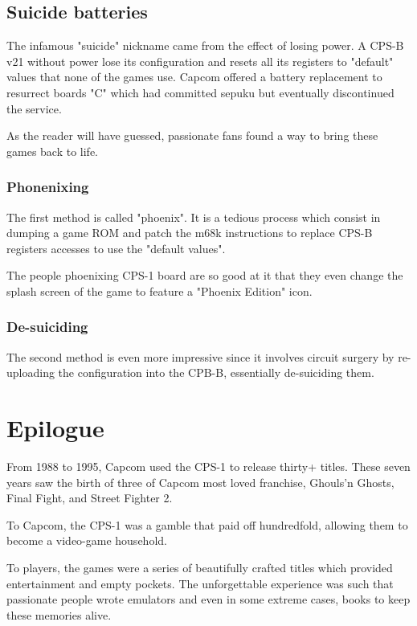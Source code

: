 \subsection{Suicide batteries}
The infamous "suicide" nickname came from the effect of losing power. A CPS-B v21 without power lose its configuration and resets all its registers to "default" values that none of the games use. Capcom offered a battery replacement to resurrect boards "C" which had committed sepuku but eventually discontinued the service. 

As the reader will have guessed, passionate fans found a way to bring these games back to life.

\subsubsection{Phonenixing}
The first method is called "phoenix". It is a tedious process which consist in dumping a game ROM and patch the m68k instructions to replace CPS-B registers accesses to use the "default values"\cite{csp1_phoenix}. 

The people phoenixing CPS-1 board are so good at it that they even change the splash screen of the game to feature a "Phoenix Edition" icon.

\subsubsection{De-suiciding}
The second method is even more impressive since it involves circuit surgery by re-uploading the configuration into the CPB-B, essentially de-suiciding them\cite{arcadeHackerCPS1Desuicide}.






\section{Epilogue}
From 1988 to 1995, Capcom used the CPS-1 to release thirty+ titles. These seven years saw the birth of three of Capcom most loved franchise, Ghouls’n Ghosts, Final Fight, and Street Fighter 2.

To Capcom, the CPS-1 was a gamble that paid off hundredfold, allowing them to become a video-game household. 

To players, the games were a series of beautifully crafted titles which provided entertainment and empty pockets. The unforgettable experience was such that passionate people wrote emulators and even in some extreme cases, books to keep these memories alive. 

